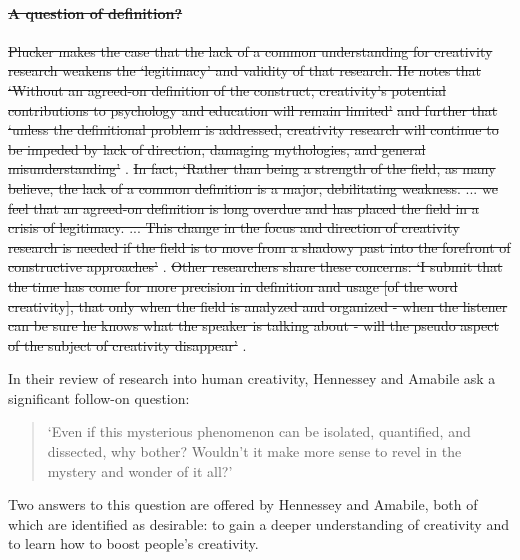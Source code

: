 \documentclass[10pt,letterpaper]{article}
\begin{document}
\paragraph{\sout{A question of definition?}}
\sout{Plucker makes the case that the lack of a common understanding for creativity research weakens the `legitimacy' and validity of that research. He notes that `Without an agreed-on definition of the construct, creativity's potential contributions to psychology and education will remain limited'} \cite[\sout{p.87}]{plucker04defn} \sout{and further that  `unless the definitional problem is addressed, creativity research will continue to be impeded by lack of direction, damaging mythologies, and general misunderstanding'} \cite[\sout{p.92}]{plucker04defn}. \sout{In fact, `Rather than being a strength of the field, as many believe, the lack of a common definition is a major, debilitating weakness. ... we feel that an agreed-on definition is long overdue and has placed the field in a crisis of legitimacy. ... This change in the focus and direction of creativity research is needed if the field is to move from a shadowy past into the forefront of constructive approaches' }\cite[\sout{p. 93}]{plucker04defn}. \sout{Other researchers share these concerns: `I submit that the time has come for more precision in definition and usage [of the word creativity], that only when the field is analyzed and organized - when the listener can be sure he knows what the speaker is talking about - will the pseudo aspect of the subject of creativity disappear' }\cite[\sout{p. 310}]{rhodes61}.

In their review of research into human creativity, Hennessey and Amabile ask a significant follow-on question: 
\begin{quote}
`Even if this mysterious phenomenon can be isolated, quantified, and dissected, why bother? Wouldn't it make more sense to revel in the mystery and wonder of it all?' 
\cite[p. 570]{hennessey10}
\end{quote}

\noindent Two answers to this question are offered by Hennessey and Amabile, both of which are identified as desirable: to gain a deeper understanding of creativity and to learn how to boost people's creativity.
\end{document}
